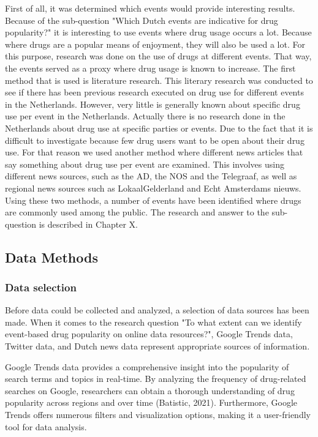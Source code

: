 First of all, it was determined which events would provide interesting results. Because of the sub-question "Which Dutch events are indicative for drug popularity?" it is interesting to use events where drug usage occurs a lot. Because where drugs are a popular means of enjoyment, they will also be used a lot.  For this purpose, research was done on the use of drugs at different events. That way, the events served as a proxy where drug usage is known to increase.
The first method that is used is literature research. This literary research was conducted to see if there has been previous research executed on drug use for different events in the Netherlands. 
However, very little is generally known about specific drug use per event in the Netherlands. Actually there is no research done in the Netherlands about drug use at specific parties or events. Due to the fact that it is difficult to investigate because few drug users want to be open about their drug use. 
For that reason we used another method where different news articles that say something about drug use per event are examined. This involves using different news sources, such as the AD, the NOS and the Telegraaf, as well as regional news sources such as LokaalGelderland and Echt Amsterdams nieuws. 
Using these two methods, a number of events have been identified where drugs are commonly used among the public. The research and answer to the sub-question is described in Chapter X.

\subsection {Data Methods}

\subsubsection{Data selection}
Before data could be collected and analyzed, a selection of data sources has been made. When it comes to the research question "To what extent can we identify event-based drug popularity on online data resources?", Google Trends data, Twitter data, and Dutch news data represent appropriate sources of information.

Google Trends data provides a comprehensive insight into the popularity of search terms and topics in real-time. By analyzing the frequency of drug-related searches on Google, researchers can obtain a thorough understanding of drug popularity across regions and over time (Batistic, 2021). Furthermore, Google Trends offers numerous filters and visualization options, making it a user-friendly tool for data analysis.

